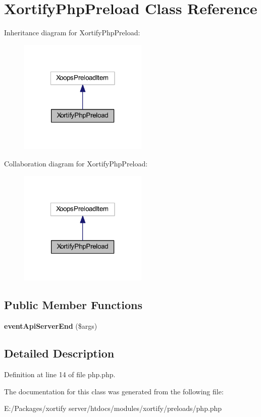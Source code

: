 \hypertarget{class_xortify_php_preload}{\section{Xortify\-Php\-Preload Class Reference}
\label{class_xortify_php_preload}
}


Inheritance diagram for Xortify\-Php\-Preload\-:
\nopagebreak
\begin{figure}[H]
\begin{center}
\leavevmode
\includegraphics[width=174pt]{class_xortify_php_preload__inherit__graph}
\end{center}
\end{figure}


Collaboration diagram for Xortify\-Php\-Preload\-:
\nopagebreak
\begin{figure}[H]
\begin{center}
\leavevmode
\includegraphics[width=174pt]{class_xortify_php_preload__coll__graph}
\end{center}
\end{figure}
\subsection*{Public Member Functions}
\begin{DoxyCompactItemize}
\item 
\hypertarget{class_xortify_php_preload_a62e459a2f1d1676b74b93eaa0e01bd02}{{\bfseries event\-Api\-Server\-End} (\$args)}\label{class_xortify_php_preload_a62e459a2f1d1676b74b93eaa0e01bd02}

\end{DoxyCompactItemize}


\subsection{Detailed Description}


Definition at line 14 of file php.\-php.



The documentation for this class was generated from the following file\-:\begin{DoxyCompactItemize}
\item 
E\-:/\-Packages/xortify server/htdocs/modules/xortify/preloads/php.\-php\end{DoxyCompactItemize}
